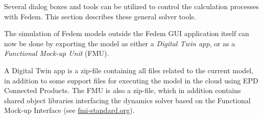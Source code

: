 
Several dialog boxes and tools can be utilized to control the calculation
processes with Fedem. This section describes these general solver tools.

\clearpage



The simulation of Fedem models outside the Fedem GUI application itself can now
be done by exporting the model as either a {\sl Digital Twin app},
or as a {\sl Functional Mock-up Unit} (FMU).

A Digital Twin app is a zip-file containing all files related to the
current model, in addition to some support files for executing the model
in the cloud using EPD Connected Products. The FMU is also a zip-file,
which in addition contains shared object libraries interfacing the
dynamics solver based on the Functional Mock-up Interface
(see \href{https://fmi-standard.org/}{fmi-standard.org}).

